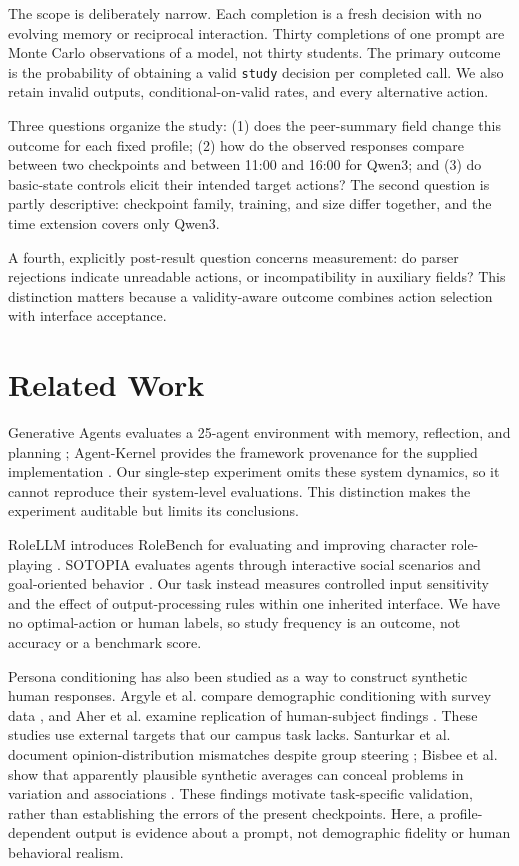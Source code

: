 \documentclass[conference]{IEEEtran}
\newcommand{\code}[1]{\texttt{#1}}
\begin{document}
The scope is deliberately narrow. Each completion is a fresh decision with no evolving memory or reciprocal interaction. Thirty completions of one prompt are Monte Carlo observations of a model, not thirty students. The primary outcome is the probability of obtaining a valid \code{study} decision per completed call. We also retain invalid outputs, conditional-on-valid rates, and every alternative action.

Three questions organize the study: (1) does the peer-summary field change this outcome for each fixed profile; (2) how do the observed responses compare between two checkpoints and between 11:00 and 16:00 for Qwen3; and (3) do basic-state controls elicit their intended target actions? The second question is partly descriptive: checkpoint family, training, and size differ together, and the time extension covers only Qwen3.

A fourth, explicitly post-result question concerns measurement: do parser rejections indicate unreadable actions, or incompatibility in auxiliary fields? This distinction matters because a validity-aware outcome combines action selection with interface acceptance.

\section{Related Work}
Generative Agents evaluates a 25-agent environment with memory, reflection, and planning \cite{park2023generative}; Agent-Kernel provides the framework provenance for the supplied implementation \cite{mao2025agentkernel}. Our single-step experiment omits these system dynamics, so it cannot reproduce their system-level evaluations. This distinction makes the experiment auditable but limits its conclusions.

RoleLLM introduces RoleBench for evaluating and improving character role-playing \cite{wang2024rolellm}. SOTOPIA evaluates agents through interactive social scenarios and goal-oriented behavior \cite{zhou2024sotopia}. Our task instead measures controlled input sensitivity and the effect of output-processing rules within one inherited interface. We have no optimal-action or human labels, so study frequency is an outcome, not accuracy or a benchmark score.

Persona conditioning has also been studied as a way to construct synthetic human responses. Argyle et al. compare demographic conditioning with survey data \cite{argyle2023out}, and Aher et al. examine replication of human-subject findings \cite{aher2023using}. These studies use external targets that our campus task lacks. Santurkar et al. document opinion-distribution mismatches despite group steering \cite{santurkar2023whose}; Bisbee et al. show that apparently plausible synthetic averages can conceal problems in variation and associations \cite{bisbee2024synthetic}. These findings motivate task-specific validation, rather than establishing the errors of the present checkpoints. Here, a profile-dependent output is evidence about a prompt, not demographic fidelity or human behavioral realism.
\end{document}
